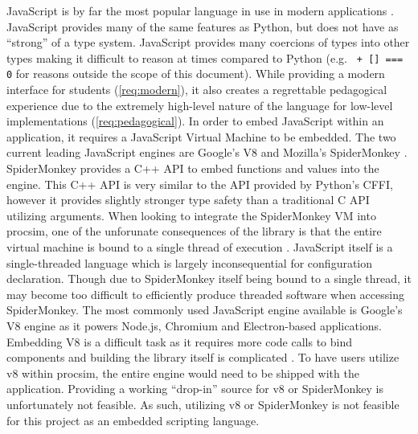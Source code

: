 JavaScript is by far the most popular language in use in modern applications \cite{StackOverflowSurvey2016}. JavaScript provides many of the same features as Python, but does not have as ``strong'' of a type system. JavaScript provides many coercions of types into other types making it difficult to reason at times compared to Python (e.g. \texttt{{} + [] === 0} for reasons outside the scope of this document). While providing a modern interface for students (\cref{req:modern}), it also creates a regrettable pedagogical experience due to the extremely high-level nature of the language for low-level implementations (\cref{req:pedagogical}). In order to embed JavaScript within an application, it requires a JavaScript Virtual Machine to be embedded. The two current leading JavaScript engines are Google's V8 \cite{Google:V8} and Mozilla's SpiderMonkey \cite{MDN:SpiderMonkey}. SpiderMonkey provides a C++ API to embed functions and values into the engine. This C++ API is very similar to the API provided by Python's CFFI, however it provides slightly stronger type safety than a traditional C API utilizing  arguments. When looking to integrate the SpiderMonkey VM into procsim, one of the unforunate consequences of the library is that the entire virtual machine is bound to a single thread of execution \cite{MDN:SpiderMonkey:UserGuide}. JavaScript itself is a single-threaded language which is largely inconsequential for configuration declaration. Though due to SpiderMonkey itself being bound to a single thread, it may become too difficult to efficiently produce threaded software when accessing SpiderMonkey. The most commonly used JavaScript engine available is Google's V8 engine \cite{Google:V8} as it powers Node.js, Chromium and Electron-based applications. Embedding V8 is a difficult task as it requires more code calls to bind components and building the library itself is complicated \cite{Google:V8:Embedding}. To have users utilize v8 within procsim, the entire engine would need to be shipped with the application. Providing a working ``drop-in'' source for v8 or SpiderMonkey is unfortunately not feasible. As such, utilizing v8 or SpiderMonkey is not feasible for this project as an embedded scripting language.

